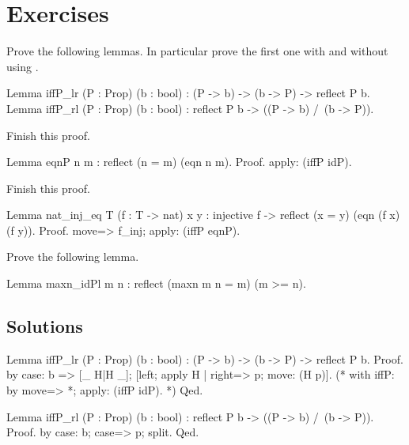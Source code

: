 \section{Exercises}

\begin{Exercise}[label=ex:iffp,difficulty=0,title={reflect}]
Prove the following lemmas.  In particular prove the first
one with and without using .

\begin{coq}{}{}
Lemma iffP_lr (P : Prop) (b : bool) :
  (P -> b) -> (b -> P) -> reflect P b.
Lemma iffP_rl (P : Prop) (b : bool) :
  reflect P b -> ((P -> b) /\ (b -> P)).
\end{coq}
\end{Exercise}

\begin{Exercise}[label=ex:eqnP,difficulty=0,title={eqnP}]
Finish this proof.

\begin{coq}{}{}
Lemma eqnP n m : reflect (n = m) (eqn n m).
Proof.
apply: (iffP idP).
\end{coq}
\end{Exercise}


\begin{Exercise}[label=ex:eqnPinj,difficulty=0,title={Injectivity to nat}]
Finish this proof.

\begin{coq}{}{}
Lemma nat_inj_eq T (f : T -> nat) x y :
  injective f -> reflect (x = y) (eqn (f x) (f y)).
Proof.
move=> f_inj; apply: (iffP eqnP).
\end{coq}
\end{Exercise}

\begin{Exercise}[label=ex:maxnidP,difficulty=0,title={Characterization of max}]
Prove the following lemma.

\begin{coq}{}{}
Lemma maxn_idPl m n : reflect (maxn m n = m) (m >= n).
\end{coq}
\end{Exercise}


\subsection{Solutions}

\begin{Answer}[ref=ex:iffp]

\begin{coq}{}{}
Lemma iffP_lr (P : Prop) (b : bool) :
  (P -> b) -> (b -> P) -> reflect P b.
Proof.
by case: b => [_ H|H _]; [left; apply H | right=> p; move: (H p)].
(* with iffP: by move=> *; apply: (iffP idP). *)
Qed.

Lemma iffP_rl (P : Prop) (b : bool) :
  reflect P b -> ((P -> b) /\ (b -> P)).
Proof. by case: b; case=> p; split. Qed.
\end{coq}

\end{Answer}

